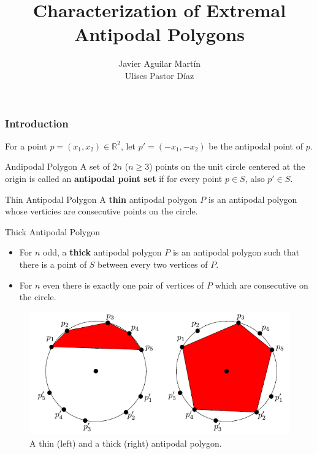 \documentclass{beamer}
\title{Characterization of Extremal Antipodal Polygons}
\author{Javier Aguilar Martín\\ Ulises Pastor Díaz}
\institute{Universidad de Sevilla}
\newcommand{\R}{\mathbb{R}}
\begin{document}
\frame{\titlepage}

\begin{frame}
\frametitle{Introduction}

For a point $p=(x_1,x_2)\in\R^2$, let $p'=(-x_1,-x_2)$ be the antipodal point of $p$.\pause

\begin{block}{Andipodal Polygon}
A set of $2n$ ($n\geq 3$) points on the unit circle centered at the origin is called an \textbf{antipodal point set} if for every point $p\in S$, also $p'\in S$.
\end{block}\pause

\begin{block}{Thin Antipodal Polygon}
A \textbf{thin} antipodal polygon $P$ is an antipodal polygon whose verticies are consecutive points on the circle.
\end{block}

\end{frame}

\begin{frame}
\begin{block}{Thick Antipodal Polygon}
\begin{itemize}
\item<1-> For $n$ odd, a \textbf{thick} antipodal polygon $P$ is an antipodal polygon such that there is a point of $S$ between every two vertices of $P$. 
\item<2-> For $n$ even there is exactly one pair of vertices of $P$ which are consecutive on the circle. 
\end{itemize}
\end{block}
\end{frame}

\begin{frame}
\begin{figure}[h!]
\centering
\includegraphics[scale=0.7]{fig1}
\caption{A thin (left) and a thick (right) antipodal polygon.}
\end{figure}
\end{frame}
\end{document}
